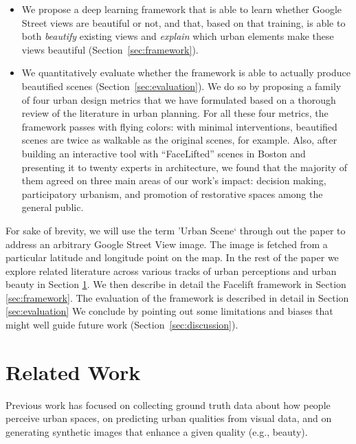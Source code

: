 \begin{itemize}
    \item We propose a deep learning framework that is able to learn whether Google Street views are beautiful or not, and that, based on that training, is able to both \emph{beautify} existing views and \emph{explain} which urban elements  make these views beautiful (Section~\ref{sec:framework}). 
    
    \item We quantitatively evaluate whether the framework is able to actually produce beautified scenes (Section~\ref{sec:evaluation}). We do so by proposing a family of four urban design metrics that we have formulated based on a thorough review of the literature in urban planning. For all these four metrics, the framework passes with flying colors: with minimal interventions, beautified scenes are twice as walkable as the original scenes, for example. Also, after building an interactive tool with ``FaceLifted'' scenes in Boston and presenting it to twenty experts in architecture,  we found that the majority of them agreed on three main areas of our work's impact: decision making, participatory urbanism, and promotion of restorative spaces among the general public. 
    
\end{itemize}
For sake of brevity, we will use the term 'Urban Scene` through out the paper to address an arbitrary Google Street View image. The image is fetched from a particular latitude and longitude point on the map. 
In the rest of the paper we explore related literature across various tracks of urban perceptions and urban beauty in Section \ref{sec:related}. We then describe in detail the Facelift framework in Section \ref{sec:framework}. The evaluation of the framework is described in detail in Section \ref{sec:evaluation} We conclude by pointing out some limitations and biases that might well guide future work (Section~\ref{sec:discussion}).






\section{Related Work}
\label{sec:related}
Previous work has focused on collecting ground truth data about how people perceive urban spaces, on predicting urban qualities from visual data, and on generating synthetic images that enhance a given quality (e.g., beauty). 


